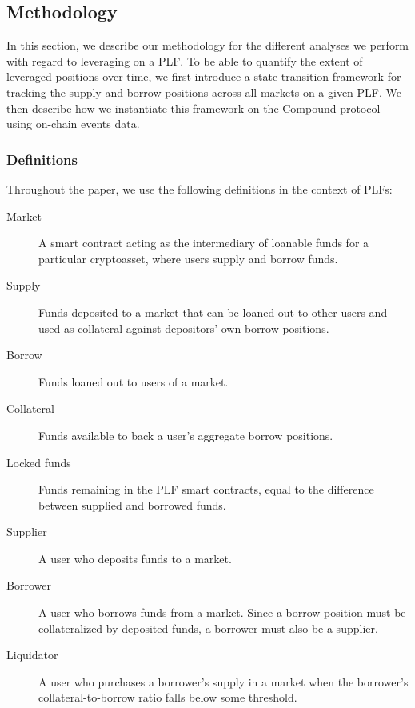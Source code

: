\subsection{Methodology}
\label{sec:methodology}

In this section, we describe our methodology for the different analyses we perform with regard to leveraging on a PLF.
To be able to quantify the extent of leveraged positions over time, we first introduce a state transition framework for tracking the supply and borrow positions across all markets on a given PLF.
We then describe how we instantiate this framework on the Compound protocol using on-chain events data.

\subsubsection{Definitions}

Throughout the paper, we use the following definitions in the context of PLFs:

\begin{description}
\item[Market] A smart contract acting as the intermediary of loanable funds for a particular cryptoasset, where users supply and borrow funds. 

\item[Supply] Funds deposited to a market that can be loaned out to other users and used as collateral against depositors' own borrow positions.

\item[Borrow] Funds loaned out to users of a market.

\item[Collateral] Funds available to back a user's aggregate borrow positions.

\item[Locked funds] Funds remaining in the PLF smart contracts, equal to the difference between supplied and borrowed funds.

\item[Supplier] A user who deposits funds to a market.

\item[Borrower] A user who borrows funds from a market. Since a borrow position must be collateralized by deposited funds, a borrower must also be a supplier.

\item[Liquidator] A user who purchases a borrower's supply in a market when the borrower's collateral-to-borrow ratio falls below some threshold.
\end{description}


